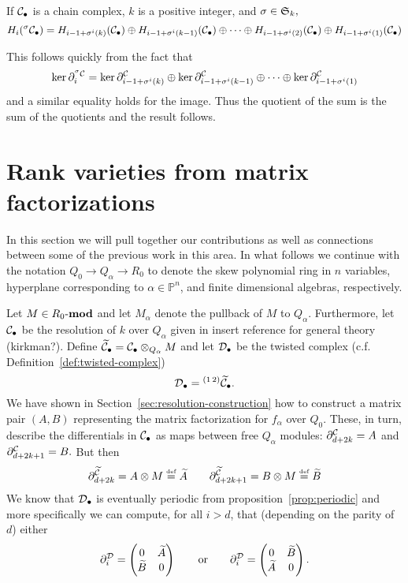 \documentclass[12pt]{article}
\begin{document}
\begin{prop}\label{prop:homology}
    If $\mathcal{C}_\bullet$ is a chain complex, $k$ is a positive integer, and $\sigma\in\mathfrak{S}_k,$
    \[H_i(^\sigma\mathcal{C}_\bullet)=H_{i-1+\sigma^i(k)}(\mathcal{C}_\bullet)\oplus H_{i-1+\sigma^i(k-1)}(\mathcal{C}_\bullet)\oplus\cdots\oplus H_{i-1+\sigma^i(2)}(\mathcal{C}_\bullet)\oplus H_{i-1+\sigma^i(1)}(\mathcal{C}_\bullet)\]
\end{prop}
\begin{prf}
    This follows quickly from the fact that
    \[\ker\partial^{^\sigma\mathcal{C}}_i=\ker\partial^{\mathcal{C}}_{i-1+\sigma^i(k)}\oplus\ker\partial^{\mathcal{C}}_{i-1+\sigma^i(k-1)}\oplus\cdots\oplus \ker\partial^{\mathcal{C}}_{i-1+\sigma^i(1)}\]
    and a similar equality holds for the image. Thus the quotient of the sum is the sum of the quotients and the result follows.
\end{prf}

\section{Rank varieties from matrix factorizations}
In this section we will pull together our contributions as well as connections between some of the previous work in this area. In what follows we continue with the notation $Q_0\to Q_\alpha\to R_0$ to denote the skew polynomial ring in $n$ variables, hyperplane corresponding to $\alpha\in\mathbb P^n$, and finite dimensional algebras, respectively.


Let $M\in R_0\text{-}\mathbf{mod}$ and let $M_\alpha$ denote the pullback of $M$ to $Q_\alpha.$ Furthermore, let $\mathcal{C}_\bullet$ be the resolution of $k$ over $Q_\alpha$ given in {\color{red} insert reference for general theory (kirkman?)}. Define $\widetilde{\mathcal{C}}_\bullet=\mathcal{C}_\bullet\otimes_{Q_\alpha} M$ and let $\mathcal{D}_\bullet$ be the twisted complex (c.f. Definition~\ref{def:twisted-complex})
\[\mathcal{D}_\bullet={^{(1\,2)}\widetilde{\mathcal{C}}_\bullet.}\]
We have shown in Section~\ref{sec:resolution-construction} how to construct a matrix pair $(A,B)$ representing the matrix factorization for $f_\alpha$ over $Q_0$. These, in turn, describe the differentials in $\mathcal{C}_\bullet$ as maps between free $Q_\alpha$ modules: $\partial^{\mathcal{C}}_{d+2k}=A$ and $\partial^{\mathcal{C}}_{d+2k+1}=B.$ But then
\[\partial^{\widetilde{\mathcal{C}}}_{d+2k}=A\otimes M\stackrel{\text{\tiny def}}{=}\widetilde{A}\qquad \partial^{\widetilde{\mathcal{C}}}_{d+2k+1}=B\otimes M\stackrel{\text{\tiny def}}{=}\widetilde{B}\]
We know that $\mathcal{D}_\bullet$ is eventually periodic from proposition~\ref{prop:periodic} and more specifically we can compute, for all $i>d$, that (depending on the parity of $d$) either
\[\partial^{\mathcal{D}}_i=\begin{pmatrix}0&\widetilde{A}\\\widetilde{B}&0\end{pmatrix}\qquad\text{or}\qquad\partial^{\mathcal{D}}_i=\begin{pmatrix}0&\widetilde{B}\\\widetilde{A}&0\end{pmatrix}.\]
\end{document}

